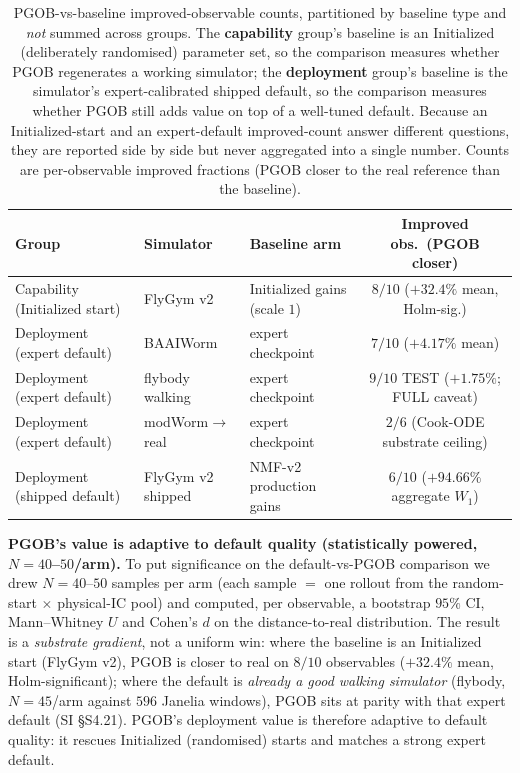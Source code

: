 \documentclass[11pt]{article}
\begin{document}
\begin{table}[H]
\centering\small
\caption{PGOB-vs-baseline improved-observable counts, partitioned by baseline type and \emph{not} summed across groups. The \textbf{capability} group's baseline is an Initialized (deliberately randomised) parameter set, so the comparison measures whether PGOB regenerates a working simulator; the \textbf{deployment} group's baseline is the simulator's expert-calibrated shipped default, so the comparison measures whether PGOB still adds value on top of a well-tuned default. Because an Initialized-start and an expert-default improved-count answer different questions, they are reported side by side but never aggregated into a single number. Counts are per-observable improved fractions (PGOB closer to the real reference than the baseline).}
\label{tab:parity_groups}
\begin{tabular}{lllc}\toprule
Group & Simulator & Baseline arm & Improved obs.\ (PGOB closer) \\\midrule
Capability (Initialized start) & FlyGym v2 & Initialized gains (scale $1$) & $8/10$ ($+32.4\%$ mean, Holm-sig.) \\\midrule
Deployment (expert default) & BAAIWorm & expert checkpoint & $7/10$ ($+4.17\%$ mean) \\
Deployment (expert default) & flybody walking & expert checkpoint & $9/10$ TEST ($+1.75\%$; FULL caveat) \\
Deployment (expert default) & modWorm$\to$real & expert checkpoint & $2/6$ (Cook-ODE substrate ceiling) \\
Deployment (shipped default) & FlyGym v2 shipped & NMF-v2 production gains & $6/10$ ($+94.66\%$ aggregate $W_1$) \\\bottomrule
\end{tabular}
\end{table}

\textbf{PGOB's value is adaptive to default quality (statistically powered, $N{=}40$--$50$/arm).} To put significance on the default-vs-PGOB comparison we drew $N{=}40$--$50$ samples per arm (each sample $=$ one rollout from the random-start $\times$ physical-IC pool) and computed, per observable, a bootstrap $95\%$ CI, Mann--Whitney $U$ and Cohen's $d$ on the distance-to-real distribution. The result is a \emph{substrate gradient}, not a uniform win: where the baseline is an Initialized start (FlyGym v2), PGOB is closer to real on $8/10$ observables ($+32.4\%$ mean, Holm-significant); where the default is \emph{already a good walking simulator} (flybody, $N{=}45$/arm against $596$ Janelia windows), PGOB sits at parity with that expert default (SI \S S4.21). PGOB's deployment value is therefore adaptive to default quality: it rescues Initialized (randomised) starts and matches a strong expert default.
\end{document}
